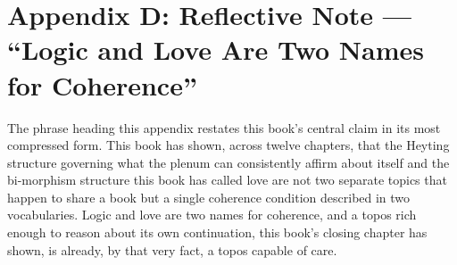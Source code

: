 \chapter*{Appendix D: Reflective Note --- ``Logic and Love Are Two Names for Coherence''}

The phrase heading this appendix restates this book's central claim in its most compressed form. This book has shown, across twelve chapters, that the Heyting structure governing what the plenum can consistently affirm about itself and the bi-morphism structure this book has called love are not two separate topics that happen to share a book but a single coherence condition described in two vocabularies. Logic and love are two names for coherence, and a topos rich enough to reason about its own continuation, this book's closing chapter has shown, is already, by that very fact, a topos capable of care.
